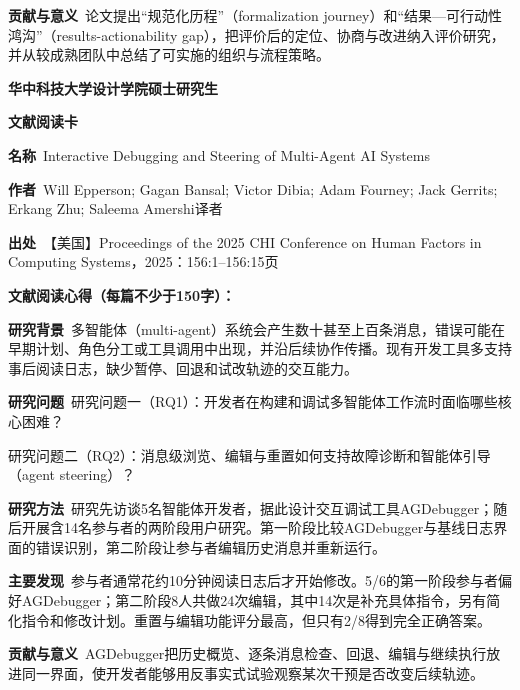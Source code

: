 \noindent\textbf{贡献与意义}\ 论文提出“规范化历程”（formalization journey）和“结果—可行动性鸿沟”（results-actionability gap），把评价后的定位、协商与改进纳入评价研究，并从较成熟团队中总结了可实施的组织与流程策略。\par
\clearpage
\begin{center}
{\songti\bfseries\fontsize{18.5pt}{27.75pt}\selectfont 华中科技大学设计学院硕士研究生\par}
{\songti\bfseries\fontsize{18.5pt}{27.75pt}\selectfont 文献阅读卡\par}
\end{center}
\vspace{0.25em}
\noindent\underline{}\par
\vspace{0.35em}
\noindent\textbf{名称}\ Interactive Debugging and Steering of Multi-Agent AI Systems\par
\noindent\textbf{作者}\ Will Epperson; Gagan Bansal; Victor Dibia; Adam Fourney; Jack Gerrits; Erkang Zhu; Saleema Amershi\quad 译者\par
\noindent\textbf{出处}\ 【美国】Proceedings of the 2025 CHI Conference on Human Factors in Computing Systems，2025：156:1–156:15\quad 页\par
\vspace{0.35em}
\noindent\textbf{文献阅读心得（每篇不少于150字）：}\par
\noindent\textbf{研究背景}\ 多智能体（multi-agent）系统会产生数十甚至上百条消息，错误可能在早期计划、角色分工或工具调用中出现，并沿后续协作传播。现有开发工具多支持事后阅读日志，缺少暂停、回退和试改轨迹的交互能力。\par
\noindent\textbf{研究问题}\ 研究问题一（RQ1）：开发者在构建和调试多智能体工作流时面临哪些核心困难？\par
研究问题二（RQ2）：消息级浏览、编辑与重置如何支持故障诊断和智能体引导（agent steering）？\par
\noindent\textbf{研究方法}\ 研究先访谈5名智能体开发者，据此设计交互调试工具AGDebugger；随后开展含14名参与者的两阶段用户研究。第一阶段比较AGDebugger与基线日志界面的错误识别，第二阶段让参与者编辑历史消息并重新运行。\par
\noindent\textbf{主要发现}\ 参与者通常花约10分钟阅读日志后才开始修改。5/6的第一阶段参与者偏好AGDebugger；第二阶段8人共做24次编辑，其中14次是补充具体指令，另有简化指令和修改计划。重置与编辑功能评分最高，但只有2/8得到完全正确答案。\par
\noindent\textbf{贡献与意义}\ AGDebugger把历史概览、逐条消息检查、回退、编辑与继续执行放进同一界面，使开发者能够用反事实式试验观察某次干预是否改变后续轨迹。\par
